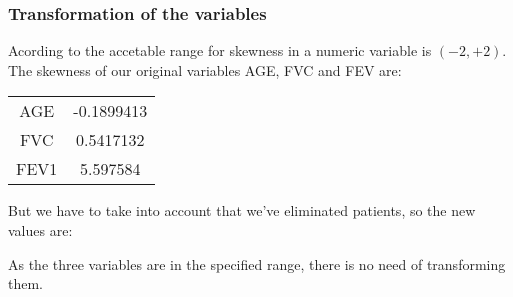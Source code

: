 

\subsubsection{Transformation of the variables}
Acording to  the accetable range for skewness in a numeric
variable is $(-2, +2)$. The skewness of our original variables AGE, FVC and FEV are:

\begin{center}
\begin{tabular}{| c | c |}
  \hline
  AGE & -0.1899413 \\
  FVC & 0.5417132 \\
  FEV1 & 5.597584 \\
  \hline
\end{tabular}
\end{center}

But we have to take into account that we've eliminated  patients, so the
new values are:


As the three variables are in the specified range, there is no need of
transforming them.




